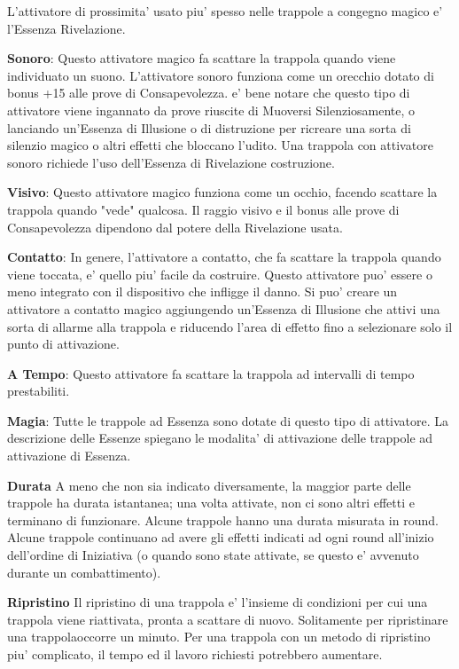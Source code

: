 \documentclass[a4paper,11pt,twoside,openany]{book}
\begin{document}
{L'attivatore di prossimita' usato piu' spesso nelle trappole a congegno magico e' l'Essenza Rivelazione.

\textbf{Sonoro}: Questo attivatore magico fa scattare la trappola quando viene individuato un suono. L'attivatore sonoro funziona come un orecchio dotato di bonus +15 alle prove di Consapevolezza. e' bene notare che questo tipo di attivatore viene ingannato da prove riuscite di Muoversi Silenziosamente, o lanciando un'Essenza di Illusione o di distruzione per ricreare una sorta di silenzio magico o altri effetti che bloccano l'udito. Una trappola con attivatore sonoro richiede l'uso dell'Essenza di Rivelazione costruzione.

\textbf{Visivo}: Questo attivatore magico funziona come un occhio, facendo scattare la trappola quando "vede" qualcosa. Il raggio visivo e il bonus alle prove di Consapevolezza dipendono dal potere della Rivelazione usata.

\textbf{Contatto}: In genere, l'attivatore a contatto, che fa scattare la trappola quando viene toccata, e' quello piu' facile da costruire. Questo attivatore puo' essere o meno integrato con il dispositivo che infligge il danno. Si puo' creare un attivatore a contatto magico aggiungendo un'Essenza di Illusione che attivi una sorta di allarme alla trappola e riducendo l'area di effetto fino a selezionare solo il punto di attivazione.

\textbf{A Tempo}: Questo attivatore fa scattare la trappola ad intervalli di tempo prestabiliti.

\textbf{Magia}: Tutte le trappole ad Essenza sono dotate di questo tipo di attivatore. La descrizione delle Essenze spiegano le modalita' di attivazione delle trappole ad attivazione di Essenza. 

\textbf{Durata}
A meno che non sia indicato diversamente, la maggior parte delle trappole ha durata istantanea; una volta attivate, non ci sono altri effetti e terminano di funzionare. Alcune trappole hanno una durata misurata in round. Alcune trappole continuano ad avere gli effetti indicati ad ogni round all'inizio dell'ordine di Iniziativa (o quando sono state attivate, se questo e' avvenuto durante un combattimento).

\textbf{Ripristino}
Il ripristino di una trappola e' l'insieme di condizioni per cui una trappola viene riattivata, pronta a scattare di nuovo. Solitamente per ripristinare una trappolaoccorre un minuto. Per una trappola con un metodo di ripristino piu' complicato, il tempo ed il lavoro richiesti potrebbero aumentare.

}
\end{document}

